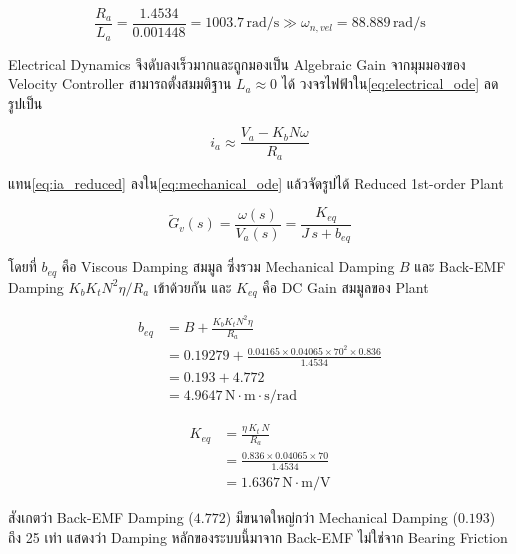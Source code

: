 \begin{equation}
    \frac{R_a}{L_a} = \frac{1.4534}{0.001448} = 1003.7\,\text{rad/s}
    \gg \omega_{n,vel} = 88.889\,\text{rad/s}
    \label{eq:elec_pole_check}
\end{equation}

Electrical Dynamics จึงดับลงเร็วมากและถูกมองเป็น
Algebraic Gain จากมุมมองของ Velocity Controller
สามารถตั้งสมมติฐาน $L_a \approx 0$ ได้
วงจรไฟฟ้าใน\cref{eq:electrical_ode} ลดรูปเป็น

\begin{equation}
    i_a \approx \frac{V_a - K_b N \omega}{R_a}
    \label{eq:ia_reduced}
\end{equation}

แทน\cref{eq:ia_reduced} ลงใน\cref{eq:mechanical_ode}
แล้วจัดรูปได้ Reduced 1st-order Plant

\begin{equation}
    \tilde{G}_v(s) = \frac{\omega(s)}{V_a(s)}
                   = \frac{K_{eq}}{J\,s + b_{eq}}
    \label{eq:Gv_red}
\end{equation}

\noindent โดยที่ $b_{eq}$ คือ Viscous Damping สมมูล
ซึ่งรวม Mechanical Damping $B$ และ Back-EMF Damping
$K_b K_t N^2 \eta / R_a$ เข้าด้วยกัน
และ $K_{eq}$ คือ DC Gain สมมูลของ Plant

\begin{equation}
    \begin{aligned}
        b_{eq} &= B + \frac{K_b K_t N^2 \eta}{R_a} \\
               &= 0.19279 + \frac{0.04165 \times 0.04065 \times 70^2 \times 0.836}{1.4534} \\
               &= 0.193 + 4.772 \\
               &= 4.9647 \, \mathrm{N \cdot m \cdot s/rad}
    \end{aligned}
    \label{eq:beq}
\end{equation}

\begin{equation}
    \begin{aligned}
        K_{eq} &= \frac{\eta \, K_t \, N}{R_a} \\
               &= \frac{0.836 \times 0.04065 \times 70}{1.4534} \\
               &= 1.6367 \, \mathrm{N \cdot m/V}
    \end{aligned}
    \label{eq:Keq}
\end{equation}

สังเกตว่า Back-EMF Damping ($4.772$) มีขนาดใหญ่กว่า
Mechanical Damping ($0.193$) ถึง 25 เท่า
แสดงว่า Damping หลักของระบบนี้มาจาก Back-EMF
ไม่ใช่จาก Bearing Friction

